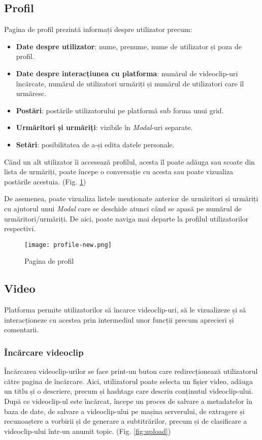 \subsection{Profil}
Pagina de profil prezintă informați despre utilizator precum:
\begin{itemize}
    \item \textbf{Date despre utilizator}: nume, prenume, nume de utilizator și poza de profil. 
    \item \textbf{Date despre interacțiunea cu platforma}: numărul de videoclip-uri încărcate,
    numărul de utilizatori urmăriți și numărul de utilizatori care îl urmăresc.
    \item \textbf{Postări}: postările utilizatorului pe platformă sub forma unui grid.
    \item \textbf{Urmăritori și urmăriți}: vizibile în \textit{Modal}-uri separate.
    \item \textbf{Setări}: posibilitatea de a-și edita datele personale.
\end{itemize}

\par
Când un alt utilizator îi accesează profilul, acesta îl poate adăuga sau scoate din lista de urmăriți,
poate începe o conversație cu acesta sau poate vizualiza postările acestuia. (Fig. \ref{fig:profile})
\par
De asemenea, poate vizualiza listele menționate anterior de urmăritori și urmăriți cu ajutorul unui
\textit{Modal} care se deschide atunci când se apasă pe numărul de urmăritori/urmăriți. De aici, poate
naviga mai departe la profilul utilizatorilor respectivi.

\begin{figure}[h!]
    \centering
    \texttt{[image: profile-new.png]}
    \caption{Pagina de profil}
    \label{fig:profile}
\end{figure}

\subsection{Video}
Platforma permite utilizatorilor să încarce videoclip-uri, să le vizualizeze și să
interacționeze cu acestea prin intermediul unor funcții precum aprecieri și comentarii.
\subsubsection{Încărcare videoclip}
Încărcarea videoclip-urilor se face print-un buton care redirecționează utilizatorul către
pagina de încărcare. Aici, utilizatorul poate selecta un fișier video, adăuga un titlu și
o descriere, precum și hashtags care descriu conținutul videoclip-ului. După ce
videoclip-ul este încărcat, începe un proces de salvare a metadatelor în baza de date,
de salvare a videoclip-ului pe mașina serverului, de extragere și recunoaștere a vorbirii
și de generare a subtitrărilor, precum și de clasificare a videoclip-ului într-un anumit
topic. (Fig. \ref{fig:upload})


